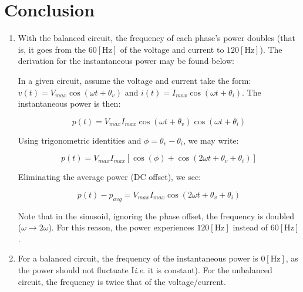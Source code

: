\documentclass[
	letterpaper, %
	10pt, %
]{CSUniSchoolLabReport}
\begin{document}
\section{Conclusion}

\begin{enumerate}

  \item With the balanced circuit, the frequency of each phase's power doubles (that is, it goes from the $60[\si{\hertz}]$ of the voltage and current to $120[\si{\hertz}]$). The derivation for the instantaneous power may be found below:

    In a given circuit, assume the voltage and current take the form: $v(t)=V_{max}\cos(\omega t+\theta_v)$ and $i(t)=I_{max}\cos(\omega t+\theta_i)$. The instantaneous power is then:

    $$p(t)=V_{max}I_{max}\cos(\omega t+\theta_v)\cos(\omega t+\theta_i)$$

    Using trigonometric identities and $\phi=\theta_v-\theta_i$, we may write:

    $$p(t)=V_{max}I_{max}[\cos(\phi)+\cos(2\omega t+\theta_v +\theta_i)]$$

    Eliminating the average power (DC offset), we see:

    $$\boxed{p(t)-p_{avg}=V_{max}I_{max}\cos(2\omega t+\theta_v +\theta_i)}$$

    Note that in the sinusoid, ignoring the phase offset, the frequency is doubled ($\omega\to 2\omega$). For this reason, the power experiences $120[\si{\hertz}]$ instead of $60[\si{\hertz}]$.

  \item For a balanced circuit, the frequency of the instantaneous power is $0[\si{\hertz}]$, as the power should not fluctuate I\textit{i}.\textit{e}. it is constant). For the unbalanced circuit, the frequency is twice that of the voltage/current.

\end{enumerate}
\end{document}
